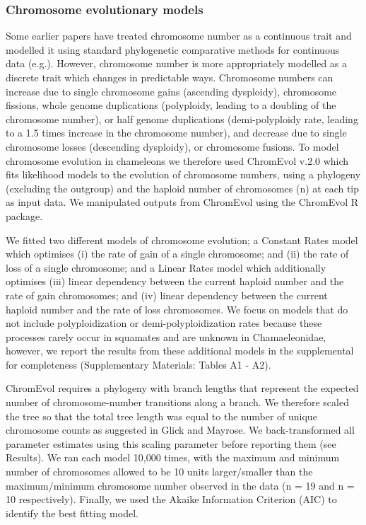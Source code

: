 \documentclass[a4paper, 12pt]{article}
\begin{document}
\subsubsection{Chromosome evolutionary models}
Some earlier papers have treated chromosome number as a continuous trait and modelled it using standard phylogenetic comparative methods for continuous data (e.g.\cite{vershinina2017evolutionary}). 
However, chromosome number is more appropriately modelled as a discrete trait which changes in predictable ways. 
Chromosome numbers can increase due to single chromosome gains (ascending dysploidy), chromosome fissions, whole genome duplications (polyploidy, leading to a doubling of the chromosome number), or half genome duplications (demi-polyploidy rate, leading to a 1.5 times increase in the chromosome number), and decrease due to single chromosome losses (descending dysploidy), or chromosome fusions. 
To model chromosome evolution in chameleons we therefore used ChromEvol v.2.0\cite{glick2014chromevol,mayrose2010probabilistic} which fits likelihood models to the evolution of chromosome numbers, using a phylogeny (excluding the outgroup) and the haploid number of chromosomes (n) at each tip as input data. 
We manipulated outputs from ChromEvol using the ChromEvol R package\cite{chromevol}.

We fitted two different models of chromosome evolution; a Constant Rates model which optimises (i) the rate of gain of a single chromosome; and (ii) the rate of loss of a single chromosome; and a Linear Rates model which additionally optimises (iii) linear dependency between the current haploid number and the rate of gain chromosomes; and (iv) linear dependency between the current haploid number and the rate of loss chromosomes. 
We focus on models that do not include polyploidization or demi-polyploidization rates because these processes rarely occur in squamates and are unknown in Chamaeleonidae\cite{bogart1980evolutionary,mezzasalma2021lizards}, however, we report the results from these additional models in the supplemental for completeness (Supplementary Materials: Tables A1 - A2). 

ChromEvol requires a phylogeny with branch lengths that represent the expected number of chromosome-number transitions along a branch. We therefore scaled the tree so that the total tree length was equal to the number of unique chromosome counts as suggested in Glick and Mayrose\cite{glick2014chromevol}. 
We back-transformed all parameter estimates using this scaling parameter before reporting them (see Results). 
We ran each model 10,000 times, with the maximum and minimum number of chromosomes allowed to be 10 units larger/smaller than the maximum/minimum chromosome number observed in the data (n = 19 and n = 10 respectively). 
Finally, we used the Akaike Information Criterion (AIC) to identify the best fitting model. 
\end{document}
